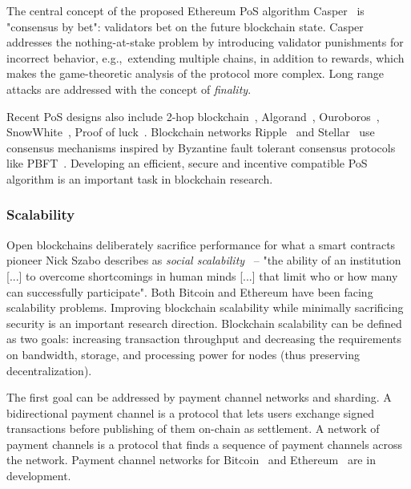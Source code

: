 The central concept of the proposed Ethereum PoS algorithm Casper~\cite{Buterin2017a} is "consensus by bet": validators bet on the future blockchain state.
Casper addresses the nothing-at-stake problem by introducing validator punishments for incorrect behavior, e.g.,~extending multiple chains, in addition to rewards, which makes the game-theoretic analysis of the protocol more complex.
Long range attacks are addressed with the concept of \textit{finality}.

Recent PoS designs also include 2-hop blockchain~\cite{Chepurnoy2017}, Algorand~\cite{Chen2019}, Ouroboros~\cite{Kiayias2017}, SnowWhite~\cite{Bentov2016a}, Proof of luck~\cite{Milutinovic2016}.
Blockchain networks Ripple~\cite{Schwartz2014} and Stellar~\cite{Mazieres2014} use consensus mechanisms inspired by Byzantine fault tolerant consensus protocols like PBFT~\cite{Castro2002}.
Developing an efficient, secure and incentive compatible PoS algorithm is an important task in blockchain research.

\subsubsection{Scalability}
Open blockchains deliberately sacrifice performance for what a smart contracts pioneer Nick Szabo describes as \textit{social scalability}~\cite{Szabo2017} -- "the ability of an institution [...] to overcome shortcomings in human minds [...] that limit who or how many can successfully participate".
Both Bitcoin and Ethereum have been facing scalability problems.
Improving blockchain scalability while minimally sacrificing security is an important research direction.
Blockchain scalability can be defined as two goals: increasing transaction throughput and decreasing the requirements on bandwidth, storage, and processing power for nodes (thus preserving decentralization).

The first goal can be addressed by payment channel networks and sharding.
A bidirectional payment channel is a protocol that lets users exchange signed transactions before publishing of them on-chain as settlement.
A network of payment channels is a protocol that finds a sequence of payment channels across the network.
Payment channel networks for Bitcoin~\cite{Poon2016} and Ethereum~\cite{RaidenWebsite} are in development.

